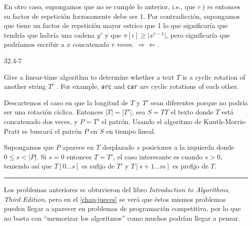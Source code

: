   En otro caso, supongamos que no se cumple lo anterior, i.e., que $r \nmid m$ entonces su factor de
  repetición forzosamente debe ser 1. Por contradicción, supongamos que tiene un factor de repetición
  mayor estrico que 1 lo que significaría que tendría que habría una cadena $y^r$ y que
  $\pi[i] \geq \vert x^{r-1} \vert$, pero significaría que podríamos escribir a $x$ concatenada $r$
  veces. $\Rightarrow\!\Leftarrow$.
  
  
  \begin{tcolorbox}
  \hypertarget{cyclic_rotation}{32.4-7}   
  Give a linear-time algorithm to determine whether a text $T$ is a cyclic rotation of another string
  $T'$ . For example, \texttt{arc} and \texttt{car} are cyclic rotations of each other.
  \end{tcolorbox}
  
  Descartemos el caso en que la longitud de $T$ y $T'$ sean diferentes porque no podría ser una
  rotación cíclica. Entonces $\vert T \vert = \vert T' \vert$, sea $S = TT$ el texto donde $T$ está
  concatenado dos veces, y $P = T'$ el patrón. Usando el algoritmo de Knuth-Morris-Pratt se buscará
  el patrón $P$ en $S$ en tiempo lineal.
  
  Supongamos que $P$ aparece en $T$ desplazado $s$ posiciones a la izquierda donde
  $0 \leq s < \vert P \vert$. Si $s = 0$ entonces $T = T'$, el caso interesante es cuando $s > 0$,
  teniendo así que $T[0 \ldots s]$ es sufijo de $T'$ y $T[s+1 \ldots m]$ es prefijo de $T$. 
  
  \noindent\rule{\textwidth}{1pt}
  
  Los problemas anteriores se obtuvieron del libro \textit{Introduction to Algorithms, Third
  Edition}\cite{cormen_2009}, pero en el \autoref{chap:jueces} se verá que éstos mismos problemas
  pueden llegar a aparecer en problemas de programación competitiva, por lo que no basta con
  ``memorizar los algoritmos'' como muchos podrían llegar a pensar.
  



